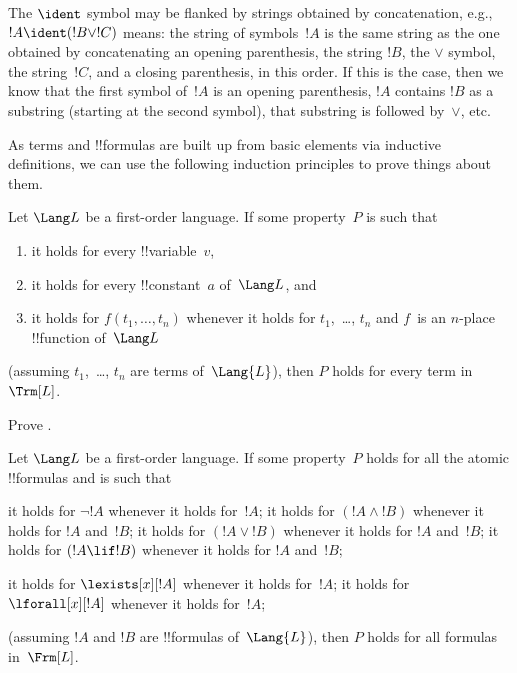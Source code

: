 The $\ident$ symbol may be flanked by strings obtained by
concatenation, e.g., $!A \ident (!B \lor !C)$ means: the string of
symbols~$!A$ is the same string as the one obtained by concatenating
an opening parenthesis, the string $!B$, the $\lor$ symbol, the
string~$!C$, and a closing parenthesis, in this order. If this is the
case, then we know that the first symbol of~$!A$ is an opening
parenthesis, $!A$ contains $!B$ as a substring (starting at the second
symbol), that substring is followed by~$\lor$, etc.

As terms and !!{formula}s are built up from basic elements via inductive
definitions, we can use the following induction principles to prove
things about them.

\begin{lem}
    Let $\Lang L$ be a first-order language.
    If some property~$P$ is such that
    
    \begin{enumerate}
        \item it holds for every !!{variable}~$v$,
        
        \item it holds for every !!{constant}~$a$ of~$\Lang L$, and
        
        \item it holds for $f(t_1,\dotsc,t_n)$ whenever it holds for
        $t_1$,~\dots, $t_n$ and $f$~is an $n$-place
            !!{function} of~$\Lang L$
    \end{enumerate}
    (assuming $t_1$,~\dots, $t_n$ are terms of~$\Lang{L}$),
    then $P$ holds for every term in~$\Trm[L]$.
\end{lem}

\begin{prob}
    Prove .
\end{prob}

\begin{lem}
    Let $\Lang L$ be a first-order language.
    If some property~$P$ holds for all the atomic !!{formula}s
    and is such that
    
    \begin{enumerate}
        it holds for $\lnot !A$ whenever it
            holds for~$!A$;
        it holds for $(!A \land !B)$
            whenever it holds for $!A$ and~$!B$;
        it holds for $(!A \lor !B)$
            whenever it holds for $!A$ and~$!B$;
        it holds for $(!A \lif !B)$
            whenever it holds for $!A$ and~$!B$;
        
        it holds for $\lexists[x][!A]$
            whenever it holds for~$!A$;
        it holds for $\lforall[x][!A]$
            whenever it holds for~$!A$;
  \end{enumerate}
  (assuming $!A$ and $!B$ are !!{formula}s of~$\Lang{L}$),
  then $P$ holds for all formulas in~$\Frm[L]$.
\end{lem}





